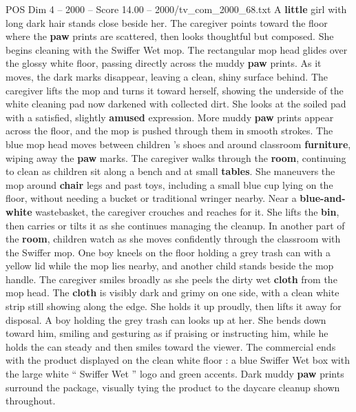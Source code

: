 \begin{textsample}{POS Dim 4 – 2000 – Score 14.00 – 2000/tv\_com\_2000\_68.txt}
A \textbf{little} girl with long dark hair stands close beside her.
The caregiver points toward the floor where the \textbf{paw} prints are scattered, then looks thoughtful but composed.
She begins cleaning with the Swiffer Wet mop.
The rectangular mop head glides over the glossy white floor, passing directly across the muddy \textbf{paw} prints.
As it moves, the dark marks disappear, leaving a clean, shiny surface behind.
The caregiver lifts the mop and turns it toward herself, showing the underside of the white cleaning pad now darkened with collected dirt.
She looks at the soiled pad with a satisfied, slightly \textbf{amused} expression.
More muddy \textbf{paw} prints appear across the floor, and the mop is pushed through them in smooth strokes.
The blue mop head moves between children ’s shoes and around classroom \textbf{furniture}, wiping away the \textbf{paw} marks.
The caregiver walks through the \textbf{room}, continuing to clean as children sit along a bench and at small \textbf{tables}.
She maneuvers the mop around \textbf{chair} legs and past toys, including a small blue cup lying on the floor, without needing a bucket or traditional wringer nearby.
Near a \textbf{blue-and-white} wastebasket, the caregiver crouches and reaches for it.
She lifts the \textbf{bin}, then carries or tilts it as she continues managing the cleanup.
In another part of the \textbf{room}, children watch as she moves confidently through the classroom with the Swiffer mop.
One boy kneels on the floor holding a grey trash can with a yellow lid while the mop lies nearby, and another child stands beside the mop handle.
The caregiver smiles broadly as she peels the dirty wet \textbf{cloth} from the mop head.
The \textbf{cloth} is visibly dark and grimy on one side, with a clean white strip still showing along the edge.
She holds it up proudly, then lifts it away for disposal.
A boy holding the grey trash can looks up at her.
She bends down toward him, smiling and gesturing as if praising or instructing him, while he holds the can steady and then smiles toward the viewer.
The commercial ends with the product displayed on the clean white floor : a blue Swiffer Wet box with the large white “ Swiffer Wet ” logo and green accents.
Dark muddy \textbf{paw} prints surround the package, visually tying the product to the daycare cleanup shown throughout.

\end{textsample}
